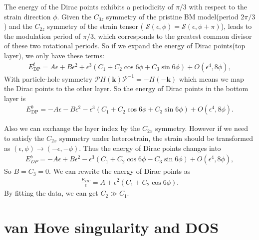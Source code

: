 \documentclass[10pt, oneside]{article}
\newcommand{\mr}[1]{\mathrm{#1}}
\newcommand{\p}[1]{\left(#1\right)}
\begin{document}
The energy of the Dirac points exhibits a periodicity of \(\pi/3\) with respect to the strain direction \(\phi\). Given the \(C_{3z}\) symmetry of the pristine BM model(period \(2 \pi/3\)) and the \(C_{2z}\) symmetry of the strain tensor ( \(\mathcal{S} \p{\epsilon, \phi} = \mathcal{S} \p{\epsilon, \phi + \pi} \)), leads to the modulation period of \(\pi/3\), which corresponds to the greatest common divisor of these two rotational periods. So if we expand the energy of Dirac points(top layer), we only have these terms:
\begin{align}
	E^{t}_{\mr{DP}}  = A \epsilon + B \epsilon^{2} + \epsilon^3 \p{C_1 + C_{2} \cos{6 \phi} + C_{3} \sin{6 \phi}} + O\p{\epsilon^{4}, 8 \phi},
\end{align}
With particle-hole symmetry \(\mathcal{P} H\p{\bm{k}} \mathcal{P}^{-1} = - H \p{ - \bm{k}}\) which means we map the Dirac points to the other layer. So the energy of Dirac points in the bottom layer is 
\begin{align}
	E^{b}_{\mr{DP}}  = - A \epsilon - B \epsilon^2 - \epsilon^3 \p{C_{1} + C_{2} \cos{6 \phi} + C_{3} \sin{6 \phi}} + O\p{\epsilon^{4}, 8 \phi}.
\end{align}

Also we can exchange the layer index by the \(C_{2x}\) symmetry. However if we need to satisfy the \(C_{2x}\) symmetry under heterostrain, the strain should be transformed as \(\p{\epsilon, \phi} \rightarrow \p{-\epsilon, -\phi}\). Thus the energy of Dirac points changes into 
\begin{align}
	E^{b}_{DP} = - A \epsilon + B \epsilon^2 - \epsilon^3 \p{C_{1} + C_{2} \cos{6 \phi} - C_{3} \sin{6 \phi}} + O\p{\epsilon^{4}, 8 \phi},
\end{align}
So \(B = C_{3} = 0\). We can rewrite the energy of Dirac points as
\begin{align}
	\boxed{
		\frac{E_{DP}}{\epsilon} = A + \epsilon^{2} \p{C_{1} + C_{2} \cos{6 \phi}}.
	}
\end{align}
By fitting the data, we can get \(C_2 \gg C_{1}\).


\section{van Hove singularity and DOS}
\end{document}
